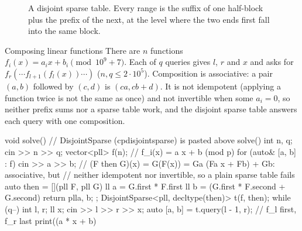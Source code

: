 \begin{figure}[htbp]
\centering
{}
\caption{A disjoint sparse table. Every range is the suffix of one half-block plus the prefix of the next, at the level where the
two ends first fall into the same block.}
\label{fig:disjoint}
\end{figure}

\begin{problem}{Composing linear functions}
There are $n$ functions $f_i(x) = a_i x + b_i \pmod{10^9 + 7}$. Each of $q$ queries gives $l$, $r$ and $x$ and asks for $f_r(\cdots
f_{l+1}(f_l(x)) \cdots)$ ($n, q \le 2 \cdot 10^5$).
\solution Composition is associative: a pair $(a, b)$ followed by $(c, d)$ is $(ca, cb + d)$. It is not idempotent (applying a
function twice is not the same as once) and not invertible when some $a_i = 0$, so neither prefix sums nor a sparse table work, and
the disjoint sparse table answers each query with one composition.
\end{problem}

\begin{code}
void solve() {  // DisjointSparse (cpdisjointsparse) is pasted above solve()
    int n, q;
    cin >> n >> q;
    vector<pll> f(n);  // f_i(x) = a x + b (mod p)
    for (auto& [a, b] : f) cin >> a >> b;
    // (F then G)(x) = G(F(x)) = Ga (Fa x + Fb) + Gb: associative, but
    // neither idempotent nor invertible, so a plain sparse table fails
    auto then = [](pll F, pll G) {
        ll a = G.first * F.first %
        ll b = (G.first * F.second + G.second) %
        return pll{a, b};
    };
    DisjointSparse<pll, decltype(then)> t(f, then);
    while (q--) {
        int l, r;
        ll x;
        cin >> l >> r >> x;
        auto [a, b] = t.query(l - 1, r);  // f_l first, f_r last
        print((a * x + b) %
    }
}
\end{code}

